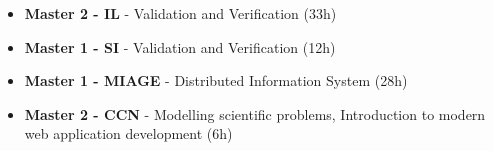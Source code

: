 {\begin{itemize}
    \item \textbf{Master 2 - IL} - Validation and Verification (33h)
    \item \textbf{Master 1 - SI} - Validation and Verification (12h)
\end{itemize}}
{\begin{itemize}
    \item \textbf{Master 1 - MIAGE} - Distributed Information System (28h)
    \item \textbf{Master 2 - CCN} - Modelling scientific problems, Introduction to modern web application development (6h) 
\end{itemize}}